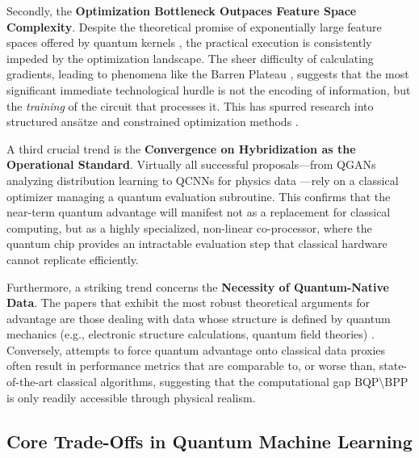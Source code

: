 \documentclass{article}
\begin{document}
Secondly, the \textbf{Optimization Bottleneck Outpaces Feature Space Complexity}. Despite the theoretical promise of exponentially large feature spaces offered by quantum kernels \cite{jager2023universal}, the practical execution is consistently impeded by the optimization landscape. The sheer difficulty of calculating gradients, leading to phenomena like the Barren Plateau \cite{cerezo2021cost}, suggests that the most significant immediate technological hurdle is not the encoding of information, but the \textit{training} of the circuit that processes it. This has spurred research into structured ansätze \cite{goto2021universal} and constrained optimization methods \cite{wang2024trainability}.

A third crucial trend is the \textbf{Convergence on Hybridization as the Operational Standard}. Virtually all successful proposals---from QGANs analyzing distribution learning \cite{zhu2022generative} to QCNNs for physics data \cite{chen2022quantum}---rely on a classical optimizer managing a quantum evaluation subroutine. This confirms that the near-term quantum advantage will manifest not as a replacement for classical computing, but as a highly specialized, non-linear co-processor, where the quantum chip provides an intractable evaluation step that classical hardware cannot replicate efficiently.

Furthermore, a striking trend concerns the \textbf{Necessity of Quantum-Native Data}. The papers that exhibit the most robust theoretical arguments for advantage are those dealing with data whose structure is defined by quantum mechanics (e.g., electronic structure calculations, quantum field theories) \cite{daley2022practical}. Conversely, attempts to force quantum advantage onto classical data proxies often result in performance metrics that are comparable to, or worse than, state-of-the-art classical algorithms, suggesting that the computational gap $\text{BQP} \setminus \text{BPP}$ is only readily accessible through physical realism.

\subsection{Core Trade-Offs in Quantum Machine Learning}

\label{sec:core\_trade\_offs\_in\_quantum\_machine\_learn}
\end{document}
